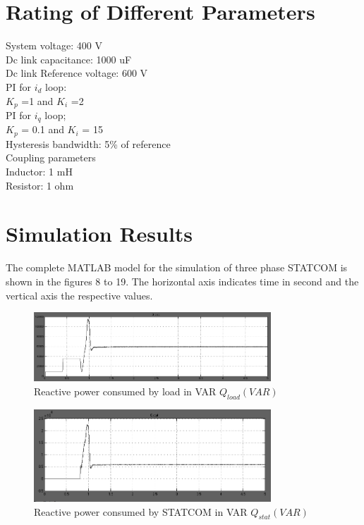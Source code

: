 \documentclass[journal,twoside]{IEEEtran}
\begin{document}
\section{Rating of Different Parameters}
System voltage: 400 V\\
Dc link capacitance: 1000 uF\\
Dc link Reference voltage: 600 V\\
PI for $i_d$ loop:\\
$K_p$ =1 and $K_i$ =2\\
PI for $i_q$ loop;\\
$K_p$ = 0.1 and $K_i$ = 15\\
Hysteresis bandwidth: 5\% of reference\\
Coupling parameters\\
Inductor: 1 mH\\
Resistor: 1 ohm\\

\section{Simulation Results}

The complete MATLAB model for the simulation
of three phase STATCOM is shown in the figures 8 to 19. The horizontal axis indicates time in second and the vertical axis the respective values.


\bigskip
\begin{figure}[!ht]
\includegraphics[width=3.5in]{a}
\caption{Reactive power consumed by load in VAR $Q_{load}(VAR)$}
\label{fa}
\end{figure}

\begin{figure}[!ht]
\includegraphics[width=3.5in]{b}
\caption{Reactive power consumed by STATCOM in VAR $Q_{stat}(VAR)$}
\label{fb }
\end{figure}
\end{document}

